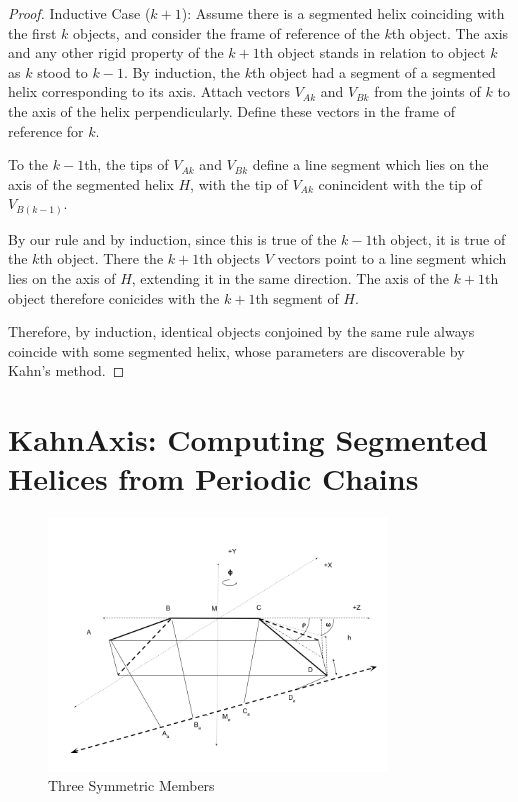 \documentclass[11pt]{article}
\begin{document}
{\begin{proof}
  Inductive Case ($k+1$):
  Assume there is a segmented helix coinciding with the first $k$ objects, and
  consider the frame of reference of the $k$th object. The axis and any
  other rigid property of the $k+1$th object stands in relation to object $k$
  as $k$ stood to $k-1$. By induction, the $k$th object had a segment
  of a segmented helix corresponding to its axis. Attach vectors $V_{Ak}$ and $V_{Bk}$
  from the
  joints of $k$ to the axis of the helix perpendicularly. Define these
  vectors in the frame of reference for $k$.

  To the $k-1$th, the tips of  $V_{Ak}$ and $V_{Bk}$ define
  a line segment which lies on the axis of the segmented helix $H$, with the
  tip of $V_{Ak}$ conincident with the tip of $V_{B(k-1)}$.

  By our rule and by induction, since this is true of the $k-1$th object,
  it is true of the $k$th object. There the $k+1$th objects $V$ vectors
  point to a line segment which lies on the axis of $H$, extending it
  in the same direction. The axis of the $k+1$th object therefore conicides 
  with the $k+1$th segment of $H$. 

  Therefore, by induction, identical objects conjoined by the same rule always
  coincide with some segmented helix, whose parameters are discoverable by
  Kahn's method.
  \end{proof}

\section{KahnAxis: Computing Segmented Helices from Periodic Chains}

\begin{figure}
     \centering
     \includegraphics[width=0.80\textwidth]{figures/TwoAngleDiagram.png}
     \caption{Three Symmetric Members}
  \label{fig:threemembersdiagram}
\end{figure}

}
\end{document}
